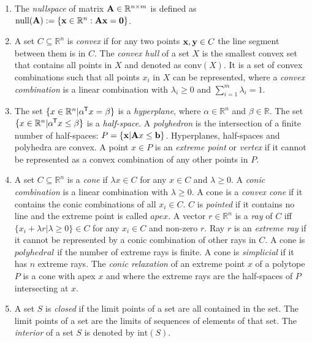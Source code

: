 \begin{enumerate}
    \item The \textit{nullspace} of matrix $\bold A \in \mathbb{R}^{n \times m}$ is defined as $\text{null}(\bold A):=\{\bold x \in \mathbb{R}^n: \bold A \bold x = \bold 0\}$.  
    
    \item A set $C \subseteq \mathbb{R}^n$ is \textit{convex} if for any two points $\bold x, \bold y \in C$ the line segment between them is in $C$. %
    The \textit{convex hull} of a set $X$ is the smallest convex set that contains all points in $X$ and denoted as $\text{conv}(X)$. It is a set of convex combinations such that all points $x_i$ in $X$ can be represented, where a \textit{convex combination} is a linear combination with $\lambda_i \geq 0$ and $\sum_{i=1}^m \lambda_i = 1$.
    
    \item The set $\{x \in \mathbb{R}^n | \alpha ^{\mkern-1.5mu\mathsf{T}} x = \beta \}$ is a \textit{hyperplane}, where $\alpha \in \mathbb{R}^n$ and $\beta \in \mathbb{R}$. The set $\{x \in \mathbb{R}^n | \alpha ^{\mkern-1.5mu\mathsf{T}} x \leq \beta \}$ is a \textit{half-space}. \cite{understanding_lp}
    A \textit{polyhedron} is the intersection of a finite number of half-spaces: $P = \{ \bold x | \bold Ax \leq \bold b\}$. Hyperplanes, half-spaces and polyhedra are convex. A point $x \in P$ is an \textit{extreme point} or \textit{vertex} if it cannot be represented as a convex combination of any other points in $P$. %
   
    \item A set $C \subseteq \mathbb{R}^n$ is a \textit{cone} if $\lambda x \in C$ for any $x \in C$ and $\lambda \geq 0$. A \textit{conic combination} is a linear combination with $\lambda \geq 0$. A cone is a \textit{convex cone} if it contains the conic combinations of all $x_i \in C$. $C$ is \textit{pointed} if it contains no line and the extreme point is called $apex$. A vector $r \in \mathbb{R}^n$ is a \textit{ray} of $C$ iff $\{x_i + \lambda r | \lambda \geq 0 \} \in C$ for any $x_i \in C$ and non-zero $r$. Ray $r$ is an \textit{extreme ray} if it cannot be represented by a conic combination of other rays in $C$. 
    A cone is $polyhedral$ if the number of extreme rays is finite. A cone is \textit{simplicial} if it has $n$ extreme rays. 
    The \textit{conic relaxation} of an extreme point $x$ of a polytope $P$ is a cone with apex $x$ and where the extreme rays are the half-spaces of $P$ intersecting at $x$.
    

    \item A set $S$ is \textit{closed} if the limit points of a set are all contained in the set. The limit points of a set are the limits of sequences of elements of that set. The \textit{interior} of a set $S$ is denoted by $\text{int}(S)$.
\end{enumerate}

